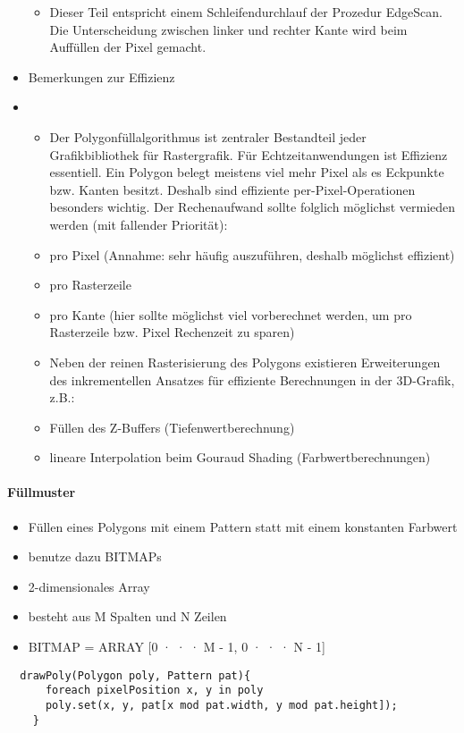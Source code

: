 \documentclass[10pt,landscape]{article}
\begin{document}
\begin{multicols}{3}
\begin{itemize}
\begin{itemize}
          \item  Dieser Teil entspricht einem Schleifendurchlauf der Prozedur EdgeScan. Die Unterscheidung zwischen linker und rechter Kante wird beim Auffüllen der Pixel gemacht.
        \end{itemize}
  \item Bemerkungen zur Effizienz
  \item \begin{itemize}
          \item Der Polygonfüllalgorithmus ist zentraler Bestandteil jeder Grafikbibliothek für Rastergrafik. Für Echtzeitanwendungen ist Effizienz essentiell. Ein Polygon belegt
                meistens viel mehr Pixel als es Eckpunkte bzw. Kanten besitzt. Deshalb sind effiziente per-Pixel-Operationen besonders wichtig. Der Rechenaufwand sollte folglich möglichst vermieden werden (mit fallender Priorität):
          \item  pro Pixel (Annahme: sehr häufig auszuführen, deshalb möglichst effizient)
          \item  pro Rasterzeile
          \item  pro Kante (hier sollte möglichst viel vorberechnet werden, um pro Rasterzeile bzw. Pixel Rechenzeit zu sparen)
          \item Neben der reinen Rasterisierung des Polygons existieren Erweiterungen des inkrementellen Ansatzes für effiziente Berechnungen in der 3D-Grafik, z.B.:
          \item Füllen des Z-Buffers (Tiefenwertberechnung)
          \item lineare Interpolation beim Gouraud Shading (Farbwertberechnungen)
        \end{itemize}
\end{itemize}

\paragraph{Füllmuster}
\begin{itemize}
  \item Füllen eines Polygons mit einem Pattern statt mit einem konstanten Farbwert
  \item benutze dazu BITMAPs
  \item 2-dimensionales Array
  \item besteht aus M Spalten und N Zeilen
  \item BITMAP = ARRAY [0 · · · M - 1, 0 · · · N - 1]
\end{itemize}
\begin{lstlisting}
  drawPoly(Polygon poly, Pattern pat){
      foreach pixelPosition x, y in poly
      poly.set(x, y, pat[x mod pat.width, y mod pat.height]);
    }
  \end{lstlisting}


\end{multicols}
\end{document}
